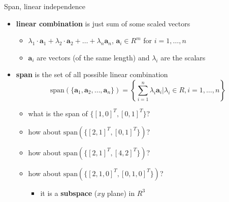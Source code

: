 \documentclass[ignorenonframetext,]{beamer}
\providecommand{\tightlist}{%
  \setlength{\itemsep}{0pt}\setlength{\parskip}{0pt}}
\newcommand{\vv}[1]{\boldsymbol{#1}}
\begin{document}
\begin{frame}{Span, linear independence}
\protect\hypertarget{span-linear-independence}{}

\begin{itemize}
\tightlist
\item
  \textbf{linear combination} is just sum of some scaled vectors

  \begin{itemize}
  \tightlist
  \item
    \(\lambda_1\cdot \vv{a}_1 + \lambda_2 \cdot \vv{a}_2+\ldots + \lambda_n\vv{a}_n\),
    \(\vv{a}_i \in R^m\) for \(i=1,\ldots,n\)
  \item
    \(\vv{a}_{i}\) are vectors (of the same length) and \(\lambda_i\)
    are the scalars
  \end{itemize}
\item
  \textbf{span} is the set of all possible linear combination
  \[\text{span}( \{\vv{a}_{1}, \vv{a}_2, \ldots,\vv{a}_n\}) = \left\{\sum_{i=1}^n \lambda_i \vv{a}_i | \lambda_i \in R, i= 1,\ldots,n\right \}\]

  \begin{itemize}
  \tightlist
  \item
    what is the span of \(\{[1,0]^T, [0,1]^T\}\)?
  \item
    how about \(\text{span}( \{[2,1]^T, [0,1]^T\})\)?
  \item
    how about \(\text{span}( \{[2,1]^T, [4,2]^T\})\)?
  \item
    how about \(\text{span}(\{[2,1,0]^T, [0,1,0]^T\})\)?

    \begin{itemize}
    \tightlist
    \item
      it is a \textbf{subspace} (\(xy\) plane) in \(R^3\)
    \end{itemize}
  \end{itemize}
\end{itemize}

\end{frame}
\end{document}
